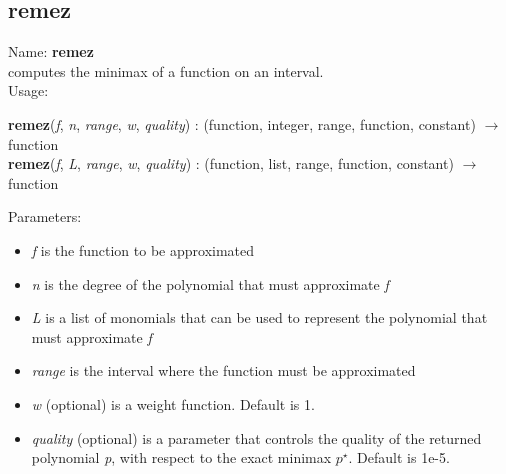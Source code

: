 \subsection{remez}
\label{labremez}
\noindent Name: \textbf{remez}\\
computes the minimax of a function on an interval.\\
\noindent Usage: 
\begin{center}
\textbf{remez}(\emph{f}, \emph{n}, \emph{range}, \emph{w}, \emph{quality}) : (\textsf{function}, \textsf{integer}, \textsf{range}, \textsf{function}, \textsf{constant}) $\rightarrow$ \textsf{function}\\
\textbf{remez}(\emph{f}, \emph{L}, \emph{range}, \emph{w}, \emph{quality}) : (\textsf{function}, \textsf{list}, \textsf{range}, \textsf{function}, \textsf{constant}) $\rightarrow$ \textsf{function}\\
\end{center}
Parameters: 
\begin{itemize}
\item \emph{f} is the function to be approximated
\item \emph{n} is the degree of the polynomial that must approximate \emph{f}
\item \emph{L} is a list of monomials that can be used to represent the polynomial that must approximate \emph{f}
\item \emph{range} is the interval where the function must be approximated
\item \emph{w} (optional) is a weight function. Default is 1.
\item \emph{quality} (optional) is a parameter that controls the quality of the returned polynomial \emph{p}, with respect to the exact minimax $p^\star$. Default is 1e-5.
\end{itemize}
